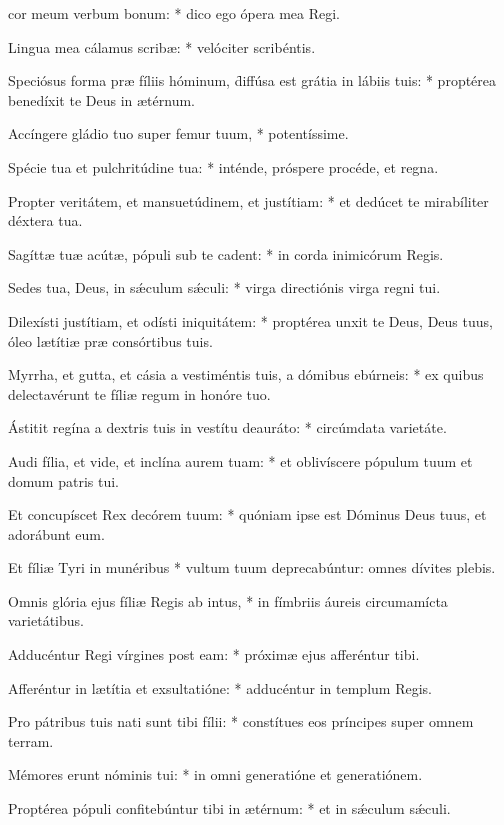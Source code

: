 \begin{psalmus}
    
 cor meum verbum bonum: * dico ego ópera mea Regi.
    
Lingua mea cálamus scribæ: * velóciter scribéntis.

Speciósus forma præ fíliis hóminum, \f diffúsa est grátia in lábiis tuis: * proptérea benedíxit te Deus in ætérnum.

Accíngere gládio tuo super femur tuum, * potentíssime.

Spécie tua et pulchritúdine tua: * inténde, próspere procéde, et regna.

Propter veritátem, et mansuetúdinem, et justítiam: * et dedúcet te mirabíliter déxtera tua.

Sagíttæ tuæ acútæ, pópuli sub te cadent: * in corda inimicórum Regis.

Sedes tua, Deus, in sǽculum sǽculi: * virga directiónis virga regni tui.

Dilexísti justítiam, et odísti iniquitátem: * proptérea unxit te Deus, Deus tuus, óleo lætítiæ præ consórtibus tuis.

Myrrha, et gutta, et cásia a vestiméntis tuis, a dómibus ebúrneis: * ex quibus delectavérunt te fíliæ regum in honóre tuo.

Ástitit regína a dextris tuis in vestítu deauráto: * circúmdata varietáte.

Audi fília, et vide, et inclína aurem tuam: * et oblivíscere pópulum tuum et domum patris tui.

Et concupíscet Rex decórem tuum: * quóniam ipse est Dóminus Deus tuus, et adorábunt eum.

Et fíliæ Tyri in munéribus * vultum tuum deprecabúntur: omnes dívites plebis.

Omnis glória ejus fíliæ Regis ab intus, * in fímbriis áureis circumamícta varietátibus.

Adducéntur Regi vírgines post eam: * próximæ ejus afferéntur tibi.

Afferéntur in lætítia et exsultatióne: * adducéntur in templum Regis.

Pro pátribus tuis nati sunt tibi fílii: * constítues eos príncipes super omnem terram.

Mémores erunt nóminis tui: * in omni generatióne et generatiónem.

Proptérea pópuli confitebúntur tibi in ætérnum: * et in sǽculum sǽculi.

\end{psalmus}
